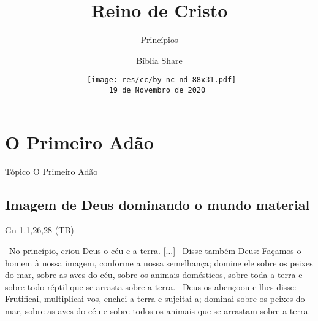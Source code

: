 \documentclass[12pt,aspectratio=169]{beamer}
\title[Reino de Cristo -- Princípios]{Reino de Cristo}
\subtitle{Princípios}
\author{Bíblia Share}
\date[{\tiny\tt 19 de Novembro de 2020}]{{\scriptsize\tt%
    \texttt{[image: res/cc/by-nc-nd-88x31.pdf]}\\[\smallskipamount]
    19 de Novembro de 2020
}}
\newcommand{\ver}[1]{%
    \raisebox{0.50ex}{%
        \scalebox{1.1}{%
            \pmb{\textbf{\textcolor{BSpbg}{#1}}}%
        }%
    }%
}
\newcommand{\QUOTE}[1]{%
    \par\noindent\hspace*{0.05\linewidth}%
    \begin{minipage}{0.9\linewidth}%
        \linespread{1.35}\large{#1}%
    \end{minipage}%
}
\newcommand{\YEL}[1]{{\textcolor{TXyel}{#1}}}
\newcommand{\CYA}[1]{{\textcolor{TXcya}{#1}}}
\newcommand{\MAG}[1]{{\textcolor{TXmag}{#1}}}
\begin{document}
\begin{frame}
    \titlepage
\end{frame}
\section{O Primeiro Adão}

    \begin{frame}
        \par\noindent\hspace*{0.05\linewidth}%
        \begin{minipage}{0.9\linewidth}%
            \large%
            \begin{alertblock}{Tópico}
                O Primeiro Adão
            \end{alertblock}
        \end{minipage}%
    \end{frame}

    \subsection{Imagem de Deus dominando o mundo material}

    \begin{frame}{Gn 1.1,26,28 (TB)}
        \QUOTE{%
            \ver{1}~No princípio, criou Deus o \CYA{céu} e a \YEL{terra}. [...]
            \ver{26}~Disse também Deus: Façamos o \YEL{homem} \MAG{à nossa imagem}, conforme a
            \MAG{nossa semelhança}; \YEL{domine ele} sobre os peixes do mar, sobre as aves do
            céu, sobre os animais domésticos, \YEL{sobre toda a terra} e sobre todo réptil que
            se arrasta sobre a terra.
            \ver{28}~Deus os abençoou e lhes disse: Frutificai, multiplicai-vos, \YEL{enchei a
            terra} e \YEL{sujeitai-a}; \YEL{dominai} sobre os peixes do mar, sobre as aves do
            céu e sobre todos os animais que se arrastam sobre a terra.
        }
    \end{frame}
\end{document}
